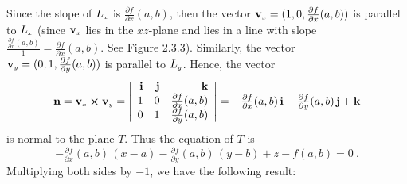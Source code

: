 \piccaption[]{}
\par\noindent Since the slope of
$L_{\scriptscriptstyle x}$ is $\frac{\partial f}{\partial x}(a,b)$, then the vector
$\textbf{v}_{\scriptscriptstyle x}=(1,0,\frac{\partial f}{\partial x}(a,b))$ is parallel to $L_{\scriptscriptstyle x}$ (since
$\textbf{v}_{\scriptscriptstyle x}$ lies in the
$xz$-plane and lies in a line with slope $\frac{\frac{\partial f}{\partial x}(a,b)}{1}=
\frac{\partial f}{\partial x}(a,b)$. See Figure 2.3.3).
Similarly, the vector\\$\textbf{v}_{\scriptscriptstyle y}=(0,1,\frac{\partial f}{\partial y}(a,b))$ is parallel to $L_{\scriptscriptstyle y}$.
Hence, the vector
\begin{displaymath}
 \textbf{n} = \textbf{v}_{\scriptscriptstyle x} \bm{\times} \textbf{v}_{\scriptscriptstyle y} =
  \left|
  \begin{array}{rrr}
   \textbf{i} & \textbf{j} & \textbf{k}\\
   1 & 0 & \tfrac{\partial f}{\partial x}(a,b)\\
   0 & 1 & \tfrac{\partial f}{\partial y}(a,b)
  \end{array}\right|
  = -\tfrac{\partial f}{\partial x}(a,b)\,\textbf{i} - \tfrac{\partial f}{\partial y}(a,b)\,\textbf{j} + \textbf{k}
\end{displaymath}
is normal to the plane $T$. Thus the equation of $T$ is
\begin{equation}
 -\tfrac{\partial f}{\partial x}(a,b)\,(x-a) - \tfrac{\partial f}{\partial y}(a,b)\,(y-b)+z-f(a,b)=0 ~.
\end{equation}
Multiplying both sides by $-1$, we have the following result:\vspace{2mm}
